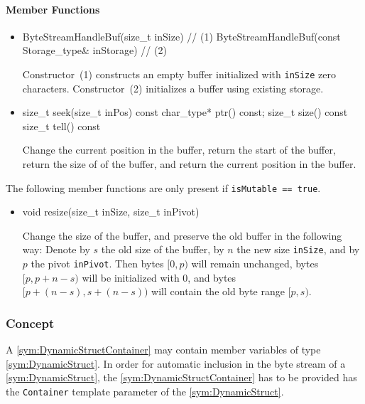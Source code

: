 \paragraph{Member Functions}

\begin{itemize}
	\item
		\begin{cppsnippet}
		ByteStreamHandleBuf(size_t inSize) // (1)
		ByteStreamHandleBuf(const Storage_type& inStorage) // (2)
		\end{cppsnippet}
		
		Constructor~(1) constructs an empty buffer initialized with \texttt{inSize} zero characters. Constructor~(2) initializes a buffer using existing storage.
	
	\item
		\begin{cppsnippet}
		size_t seek(size_t inPos)
		const char_type* ptr() const;
		size_t size() const
		size_t tell() const
		\end{cppsnippet}

		Change the current position in the buffer, return the start of the buffer, return the size of of the buffer, and return the current position in the buffer.
\end{itemize}

The following member functions are only present if \texttt{isMutable == true}.
\begin{itemize}
	\item
		\begin{cppsnippet}
		void resize(size_t inSize, size_t inPivot)
		\end{cppsnippet}
		
		Change the size of the buffer, and preserve the old buffer in the following way: Denote by $s$ the old size of the buffer, by $n$ the new size \texttt{inSize}, and by $p$ the pivot \texttt{inPivot}. Then bytes $[0, p)$ will remain unchanged, bytes $[p, p + n - s)$ will be initialized with 0, and bytes $[p + (n - s), s + (n - s))$ will contain the old byte range $[p, s)$.
\end{itemize}


\subsubsection[Concept DynamicStructContainer]{Concept }

A \ref{sym:DynamicStructContainer} may contain member variables of type \ref{sym:DynamicStruct}. In order for automatic inclusion in the byte stream of a \ref{sym:DynamicStruct}, the \ref{sym:DynamicStructContainer} has to be provided has the \texttt{Container} template parameter of the \ref{sym:DynamicStruct}.

